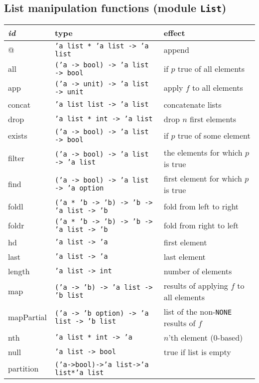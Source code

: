 \documentclass[fleqn,a4paper]{article}
\begin{document}
\subsection*{List manipulation functions (module {\tt List})}

\begin{tabular}{@{\tt\ \ }lll}\hline
{\it id\/}  &  type &     effect \\\hline
@           & {\tt 'a list * 'a list -> 'a list} 
        &    append\\
all         & {\tt ('a -> bool) -> 'a list -> bool} 
        & if $p$ true of all elements\\
app         & {\tt ('a -> unit) -> 'a list -> unit} 
        & apply $f$ to all elements\\
concat      & {\tt 'a list list -> 'a list} 
        & concatenate lists\\
drop    & {\tt 'a list * int -> 'a list}
        & drop $n$ first elements\\
exists      & {\tt ('a -> bool) -> 'a list -> bool} 
        & if $p$ true of some element\\
filter      & {\tt ('a -> bool) -> 'a list -> 'a list}
        & the elements for which $p$ is true\\
find        & {\tt ('a -> bool) -> 'a list -> 'a option} 
        & first element for which $p$ is true\\
foldl       & {\tt ('a * 'b -> 'b) -> 'b -> 'a list -> 'b}
        & fold from left to right\\
foldr       & {\tt ('a * 'b -> 'b) -> 'b -> 'a list -> 'b}
        & fold from right to left\\
hd          & {\tt 'a list -> 'a}
        & first element\\
last        & {\tt 'a list -> 'a}
        & last element\\
length      & {\tt 'a list -> int}
        & number of elements\\
map         & {\tt ('a -> 'b) -> 'a list -> 'b list}
        & results of applying $f$ to all elements\\
mapPartial  & {\tt ('a -> 'b option) -> 'a list -> 'b list} 
        & list of the non-{\tt NONE} results of $f$\\
nth         & {\tt 'a list * int -> 'a}
        & $n$'th element (0-based)\\
null        & {\tt 'a list -> bool}
        & true if list is empty\\
partition   & {\tt ('a->bool)->'a list->'a list*'a list}

\end{tabular}
\end{document}
